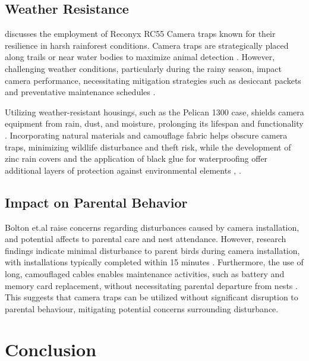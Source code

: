 \documentclass[class=report,11pt,crop=false]{standalone}
\begin{document}
 
\subsection{Weather Resistance}

\cite{kays2009camera} discusses the employment of Reconyx RC55 Camera traps known for their resilience in harsh rainforest conditions. Camera traps are strategically placed along trails or near water bodies to maximize animal detection \cite{kays2009camera}. However, challenging weather conditions, particularly during the rainy season, impact camera performance, necessitating mitigation strategies such as desiccant packets and preventative maintenance schedules \cite{kays2009camera}.

Utilizing weather-resistant housings, such as the Pelican 1300 case, shields camera equipment from rain, dust, and moisture, prolonging its lifespan and functionality \cite{kays2009camera}. Incorporating natural materials and camouflage fabric helps obscure camera traps, minimizing wildlife disturbance and theft risk, while the development of zinc rain covers and the application of black glue for waterproofing offer additional layers of protection against environmental elements \cite{kays2009camera}, \cite{glover2019camera}. 


\subsection{Impact on Parental Behavior}

Bolton et.al \cite{bolton2007remote} raise concerns regarding disturbances caused by camera installation, and potential affects to parental care and nest attendance. However, research findings indicate minimal disturbance to parent birds during camera installation, with installations typically completed within 15 minutes \cite{bolton2007remote}. Furthermore, the use of long, camouflaged cables enables maintenance activities, such as battery and memory card replacement, without necessitating parental departure from nests \cite{bolton2007remote}. This suggests that camera traps can be utilized without significant disruption to parental behaviour, mitigating potential concerns surrounding disturbance.

\section{Conclusion}
\end{document}

